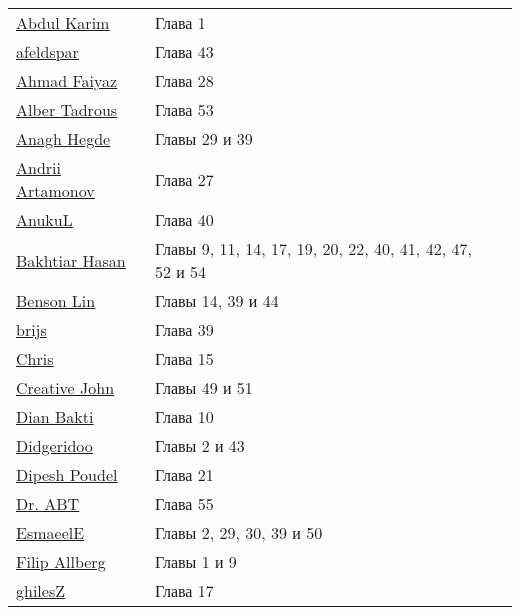 \vspace{\baselineskip}
\begin{tabular}{p{50mm}ll}
\href{https://stackoverflow.com/users/5108673/}{\underline{Abdul Karim}} & Глава 1 \\
\href{https://stackoverflow.com/users/33904/}{\underline{afeldspar}} & Глава 43 \\
\href{https://stackoverflow.com/users/1890199/}{\underline{Ahmad Faiyaz}} & Глава 28 \\
\href{https://stackoverflow.com/users/7310948/}{\underline{Alber Tadrous}} & Глава 53 \\
\href{https://stackoverflow.com/users/6181189/}{\underline{Anagh Hegde}} & Главы 29 и 39 \\
\href{https://stackoverflow.com/users/5339154/}{\underline{Andrii Artamonov}} & Глава 27 \\
\href{https://stackoverflow.com/users/2795050/}{\underline{AnukuL}} & Глава 40 \\
\href{https://stackoverflow.com/users/6879340/}{\underline{Bakhtiar Hasan}} & Главы 9, 11, 14, 17, 19, 20, 22, 40, 41, 42, 47, 52 и 54 \\
\href{https://stackoverflow.com/users/6800367/}{\underline{Benson Lin}} & Главы 14, 39 и 44 \\
\href{https://stackoverflow.com/users/5304035/}{\underline{brijs}} & Глава 39 \\
\href{https://stackoverflow.com/users/2341336/}{\underline{Chris}} & Глава 15 \\
\href{https://stackoverflow.com/users/5065086/}{\underline{Creative John}} & Главы 49 и 51 \\
\href{https://stackoverflow.com/users/7003027/}{\underline{Dian Bakti}} & Глава 10 \\
\href{https://stackoverflow.com/users/1307725/}{\underline{Didgeridoo}} & Главы 2 и 43 \\
\href{https://stackoverflow.com/users/5309397/}{\underline{Dipesh Poudel}} & Глава 21 \\
\href{https://stackoverflow.com/users/303612/}{\underline{Dr. ABT}} & Глава 55 \\
\href{https://stackoverflow.com/users/7508077/}{\underline{EsmaeelE}} & Главы 2, 29, 30, 39 и 50 \\
\href{https://stackoverflow.com/users/5045375/}{\underline{Filip Allberg}} & Главы 1 и 9 \\
\href{https://stackoverflow.com/users/7214292/}{\underline{ghilesZ}} & Глава 17 \\

\end{tabular}
